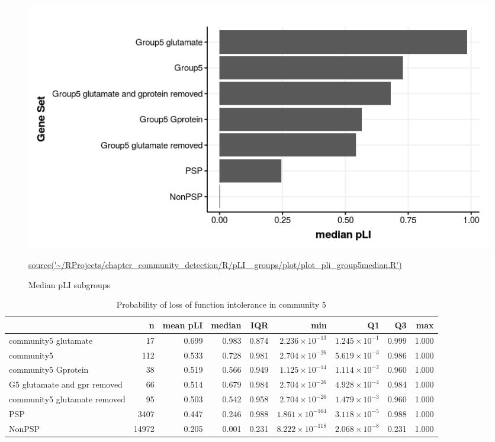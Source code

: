 \begin{figure}
    \centering
    \includegraphics[width=\textwidth]{images/chapter_community_detection/ggplot2/pLI_group5_glutamate/Rplot_median_pLI.png}
    \caption{Median pLI subgroups}
    \tiny\url{source('~/RProjects/chapter_community_detection/R/pLI _groups/plot/plot_pli_group5median.R')}
    \label{fig:barplot pli median subgroups group5}
\end{figure}

\begin{table}[ht]
\centering
\setlength{\extrarowheight}{2pt}
\begin{adjustbox}{width=\textwidth}
\begin{tabular}{lrrrrrrrr}
  \toprule
 & n & mean pLI & median & IQR & min & Q1 & Q3 & max \\ 
  \midrule
community5 glutamate & 17 & 0.699 & 0.983 & 0.874 & $2.236 \times 10^{-13}$ & $1.245 \times 10^{-1}$ & 0.999 & 1.000 \\ 
  community5 & 112 & 0.533 & 0.728 & 0.981 & $2.704 \times 10^{-26}$ & $5.619 \times 10^{-3}$ & 0.986 & 1.000 \\ 
  community5 Gprotein & 38 & 0.519 & 0.566 & 0.949 & $1.125 \times 10^{-14}$ & $1.114 \times 10^{-2}$ & 0.960 & 1.000 \\ 
  G5 glutamate and gpr removed & 66 & 0.514 & 0.679 & 0.984 & $2.704 \times 10^{-26}$ & $4.928 \times 10^{-4}$ & 0.984 & 1.000 \\ 
  community5 glutamate removed & 95 & 0.503 & 0.542 & 0.958 & $2.704 \times 10^{-26}$ & $1.479 \times 10^{-3}$ & 0.960 & 1.000 \\ 
  PSP & 3407 & 0.447 & 0.246 & 0.988 & $1.861 \times 10^{-164}$ & $3.118 \times 10^{-5}$ & 0.988 & 1.000 \\ 
  NonPSP & 14972 & 0.205 & 0.001 & 0.231 & $8.222 \times 10^{-118}$ & $2.068 \times 10^{-8}$ & 0.231 & 1.000 \\ 
   \bottomrule
\end{tabular}
\end{adjustbox}
\caption{Probability of loss of function intolerance in community 5} 
\label{tab:Probability of loss of function intolerance in group 5}
\end{table}


